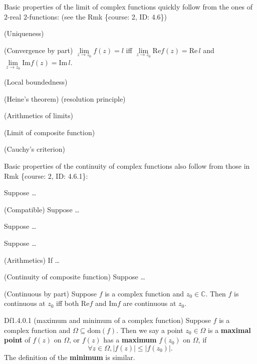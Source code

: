 \documentclass{article}
\begin{document}
\begin{Rmk}{}
    Basic properties of the limit of complex functions quickly follow from the ones of $2$-real $2$-functions: (see the Rmk \{course: 2, ID: 4.6\})
    \begin{compactenum}
        \item \textcolor{Th}{(Uniqueness)}
        \item \textcolor{Th}{(Convergence by part) $\lim\limits_{z\to z_0} f(z) = l$ iff $\lim\limits_{z\to z_0} \text{Re}f(z) = \text{Re}\, l$ and $\lim\limits_{z\to z_0} \text{Im}f(z) = \text{Im}\,l$.}
        \item \textcolor{Th}{(Local boundedness)}
        \item \textcolor{Th}{(Heine's theorem) (resolution principle)}
        \item \textcolor{Th}{(Arithmetics of limits)}
        \item \textcolor{Th}{(Limit of composite function)}
        \item \textcolor{Th}{(Cauchy's criterion)}
    \end{compactenum}
    Basic properties of the continuity of complex functions also follow from those in Rmk \{course: 2, ID: 4.6.1\}:
    \begin{compactenum}
        \item \textcolor{Df}{Suppose \dots}
        \item \textcolor{Th}{(Compatible) Suppose \dots}
        \item \textcolor{Th}{Suppose \dots}
        \item \textcolor{Th}{Suppose \dots}
        \item \textcolor{Th}{(Arithmetics) If \dots}
        \item \textcolor{Th}{(Continuity of composite function) Suppose \dots}
        \item \textcolor{Th}{(Continuous by part) Suppose $f$ is a complex function and $z_0\in\mathbb{C}$. Then $f$ is continuous at $z_0$ iff both $\text{Re}f$ and $\text{Im}f$ are continuous at $z_0$.}
    \end{compactenum}
\end{Rmk}

\begin{Df}{Df1.4.0.1 (maximum and minimum of a complex function)}
    Suppose $f$ is a complex function and $\varOmega\subseteq\text{dom}(f)$. Then we say a point $z_0\in\varOmega$ is a \textbf{maximal point} of $f(z)$ on $\varOmega$, or $f(z)$ has a \textbf{maximum} $f(z_0)$ on $\varOmega$, if
    $$\forall z\in\varOmega, |f(z)| \leq |f(z_0)|.$$
    The definition of the \textbf{minimum} is similar.
\end{Df}
\end{document}
